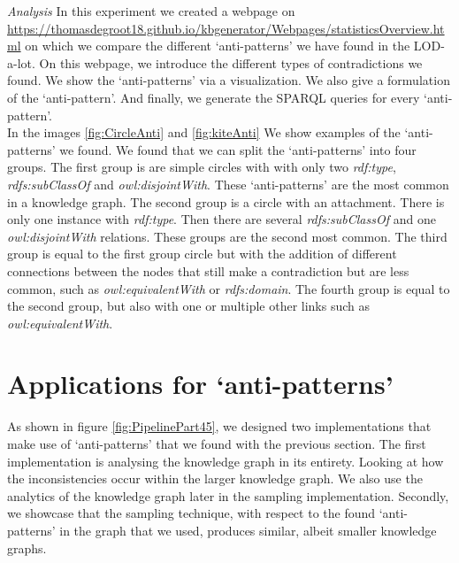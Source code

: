 \documentclass[11pt,letterpaper ,oneside ]{book}
\begin{document}
	\textit{Analysis} In this experiment we created a webpage on\\ \url{https://thomasdegroot18.github.io/kbgenerator/Webpages/statisticsOverview.html} on which we compare the different `anti-patterns' we have found in the LOD-a-lot. On this webpage, we introduce the different types of contradictions we found. We show the `anti-patterns' via a visualization. We also give a formulation of the `anti-pattern'. And finally, we generate the SPARQL queries for every `anti-pattern'.  \\
	In the images \ref{fig:CircleAnti} and \ref{fig:kiteAnti} We show examples of the `anti-patterns' we found. We found that we can split the `anti-patterns' into four groups. The first group is are simple circles with with only two \textit{rdf:type}, \textit{rdfs:subClassOf} and \textit{owl:disjointWith}. These `anti-patterns' are the most common in a knowledge graph. The second group is a circle with an attachment. There is only one instance with \textit{rdf:type}. Then there are several \textit{rdfs:subClassOf} and one \textit{owl:disjointWith} relations. These groups are the second most common.  The third group is equal to the first group circle but with the addition of different connections between the nodes that still make a contradiction but are less common, such as \textit{owl:equivalentWith} or \textit{rdfs:domain}. The fourth group is equal to the second group, but also with one or multiple other links such as \textit{owl:equivalentWith}. \\
	\newpage
	
	\chapter{Applications for `anti-patterns'}\label{Implementation}
	As shown in figure \ref{fig:PipelinePart45}, we designed two implementations that make use of `anti-patterns' that we found with the previous section. The first implementation is analysing the knowledge graph in its entirety. Looking at how the inconsistencies occur within the larger knowledge graph. We also use the analytics of the knowledge graph later in the sampling implementation. Secondly, we showcase that the sampling technique, with respect to the found `anti-patterns' in the graph that we used, produces similar, albeit smaller knowledge graphs.
	
\end{document}
